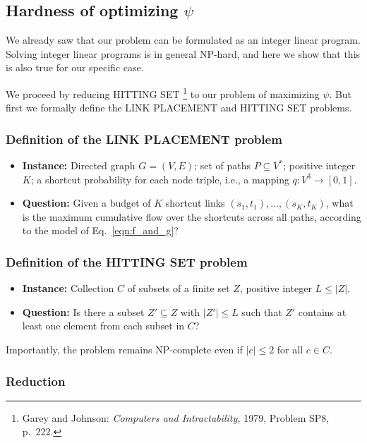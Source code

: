 \documentclass[11pt,letterpaper]{article}
\newcommand{\LP}{LINK PLACEMENT}
\newcommand{\HS}{HITTING SET}
\begin{document}
\subsection{Hardness of optimizing $\psi$}

We already saw that our problem can be formulated as an integer linear program.
Solving integer linear programs is in general NP-hard, and here we show that this is also true for our specific case.

We proceed by reducing \HS{}%
\footnote{Garey and Johnson: {\it Computers and Intractability,} 1979, Problem SP8, p.~222.}
to our problem of maximizing $\psi$.
But first we formally define the \LP{} and \HS{} problems.

\subsubsection{Definition of the \LP{} problem}

\begin{itemize}
\item {\bf Instance:} Directed graph $G=(V,E)$;
set of paths $P \subseteq V^*$;
positive integer $K$;
a shortcut probability for each node triple, i.e., a mapping $q : V^3 \rightarrow [0,1]$.
\item {\bf Question:} Given a budget of $K$ shortcut links $(s_1,t_1), \dots, (s_K,t_K)$, what is the maximum cumulative flow over the shortcuts across all paths, according to the model of Eq.~\ref{eqn:f_and_g}?
\end{itemize}

\subsubsection{Definition of the \HS{} problem}

\begin{itemize}
\item {\bf Instance:} Collection $C$ of subsets of a finite set $Z$, positive integer $L \leq |Z|$.
\item {\bf Question:} Is there a subset $Z' \subseteq Z$ with $|Z'| \leq L$ such that $Z'$ contains at least one element from each subset in $C$?
\end{itemize}

Importantly, the problem remains NP-complete even if $|c| \leq 2$ for all $c \in C$.

\subsubsection{Reduction}
\end{document}
